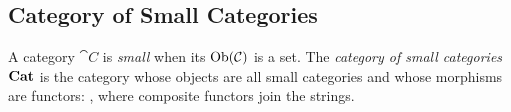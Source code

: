 
\subsection{Category of Small Categories}

A category $\cat{C}$ is \textit{small} when its $\operatorname{Ob}(\mathcal{C})$ is a set. %
The \textit{category of small categories} $\boldsymbol{\mathrm{Cat}}$ is the category whose objects are %
all small categories and whose morphisms are functors:
, where composite functors join the strings.

